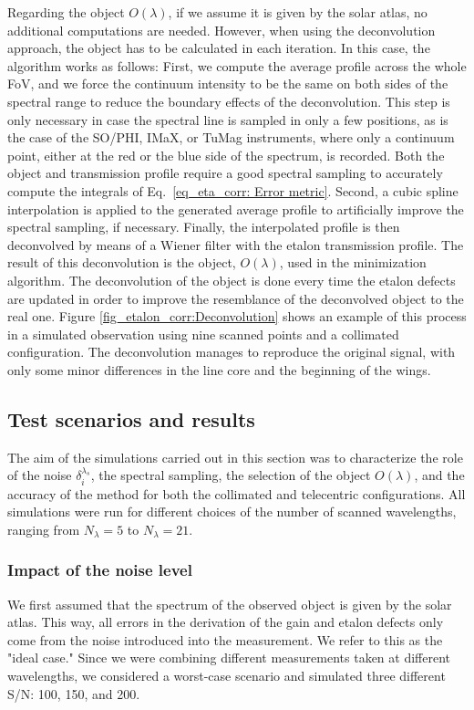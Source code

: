 Regarding the object $O(\lambda)$, if we assume it is given by the solar atlas, no additional computations are needed. However, when using the deconvolution approach, the object has to be calculated in each iteration. In this case, the algorithm works as follows: First, we compute the average profile across the whole FoV, and we force the continuum intensity to be the same on both sides of the spectral range to reduce the boundary effects of the deconvolution. This step is only necessary in case the spectral line is sampled in only a few positions, as is the case of the SO/PHI, IMaX, or TuMag instruments, where only a continuum point, either at the red or the blue side of the spectrum, is recorded. Both the object and transmission profile require a good spectral sampling to accurately compute the integrals of Eq.~\eqref{eq_eta_corr: Error metric}. Second, a cubic spline interpolation is applied to the generated average profile to artificially improve the spectral sampling, if necessary. Finally, the interpolated profile is then deconvolved by means of a Wiener filter with the etalon transmission profile. The result of this deconvolution is the object, $O(\lambda)$, used in the minimization algorithm. The deconvolution of the object is done every time the etalon defects are updated in order to improve the resemblance of the deconvolved object to the real one. Figure \ref{fig_etalon_corr:Deconvolution} shows an example of this process in a simulated observation using nine scanned points and a collimated configuration. The deconvolution manages to reproduce the original signal, with only some minor differences in the line core and the beginning of the wings.

\subsection{\label{eta_corr_susec: results}Test scenarios and results}

The aim of the simulations carried out in this section was to characterize the role of the noise $\delta _ i ^ {\lambda_s}$, the spectral sampling, the selection of the object $O(\lambda)$, and the accuracy of the method for both the collimated and telecentric configurations. All simulations were run for different choices of the number of scanned wavelengths, ranging from $N_\lambda=5$ to $N_\lambda=21$. 

\subsubsection{Impact of the noise level}
We first assumed that the spectrum of the observed object is given by the solar atlas. This way, all errors in the derivation of the gain and etalon defects only come from the noise introduced into the measurement. We refer to this as the "ideal case." Since we were combining different measurements taken at different wavelengths, we considered a worst-case scenario and simulated three different S/N: 100, 150, and 200. 

